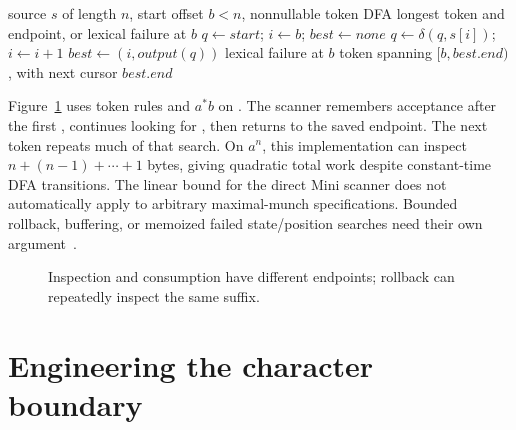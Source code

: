 \begin{algorithm}[htbp]
\caption{Select one longest token while preserving the last accepting endpoint.}
\label{alg:ch49-munch}
\begin{pseudocode}
\Require source $s$ of length $n$, start offset $b<n$, nonnullable token DFA
\Ensure longest token and endpoint, or lexical failure at $b$
\State $q\gets start$; $i\gets b$; $best\gets none$
  \State $q\gets\delta(q,s[i])$; $i\gets i+1$
    \State $best\gets(i,output(q))$
  \EndIf
\EndWhile
{}
  \State \Return lexical failure at $b$
\EndIf
\State \Return token spanning $[b,best.end)$, with next cursor $best.end$
\end{pseudocode}
\end{algorithm}

Figure~\ref{fig:ch49-rollback} uses token rules  and $a^*b$ on .
The scanner remembers acceptance after the first , continues looking for , then returns to the saved endpoint.
The next token repeats much of that search.
On $a^n$, this implementation can inspect $n+(n-1)+\cdots+1$ bytes, giving quadratic total work despite constant-time DFA transitions.
The linear bound for the direct Mini scanner does not automatically apply to arbitrary maximal-munch specifications.
Bounded rollback, buffering, or memoized failed state/position searches need their own argument~\cite{grune-2008-parsing}.

\begin{figure}[htbp]
\centering
{}
\caption{Inspection and consumption have different endpoints; rollback can repeatedly inspect the same suffix.}
\label{fig:ch49-rollback}
\end{figure}

\section{Engineering the character boundary}
\label{sec:ch49-engineering}

